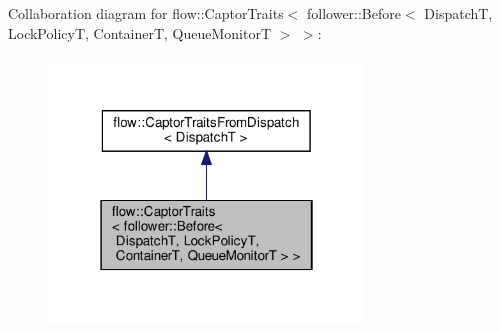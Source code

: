 Collaboration diagram for flow\+:\+:Captor\+Traits$<$ follower\+:\+:Before$<$ DispatchT, Lock\+PolicyT, ContainerT, Queue\+MonitorT $>$ $>$\+:
\nopagebreak
\begin{figure}[H]
\begin{center}
\leavevmode
\includegraphics[width=238pt]{structflow_1_1_captor_traits_3_01follower_1_1_before_3_01_dispatch_t_00_01_lock_policy_t_00_01_c297c7fc392fcee21430e63ee294690bb}
\end{center}
\end{figure}
